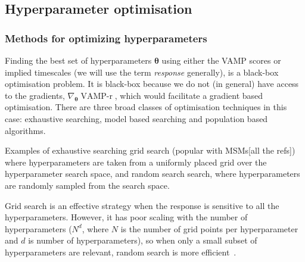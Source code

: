 \documentclass[journal=jacsat,manuscript=article]{achemso}
\begin{document}
\subsection{Hyperparameter optimisation}

\subsubsection{Methods for optimizing hyperparameters}

Finding the best set of hyperparameters $\bm{\theta}$ using either the VAMP scores or implied timescales (we will use the term \emph{response} generally), is a black-box optimisation problem.  It is black-box because we do not (in general) have access to the gradients, $\nabla_{\bm{\theta}} \operatorname{VAMP-r}$, which would facilitate a gradient based optimisation.  There are three broad classes of optimisation techniques in this case: exhaustive searching,  model based searching and population based algorithms. 

Examples of exhaustive searching grid search (popular with MSMs[all the refs]) where hyperparameters are taken from a uniformly placed grid over the hyperparameter search space, and random search search, where hyperparameters are randomly sampled from the search space. 

Grid search is an effective strategy when the response is sensitive to all the hyperparameters.  However, it has poor scaling with the number of hyperparameters ($N^d$, where $N$ is the number of grid points per hyperparameter and $d$ is number of hyperparameters), so when only a small subset of hyperparameters are relevant, random search is more efficient~\cite{bergstra_jamesbergstra_random_2012}.  
\end{document}

